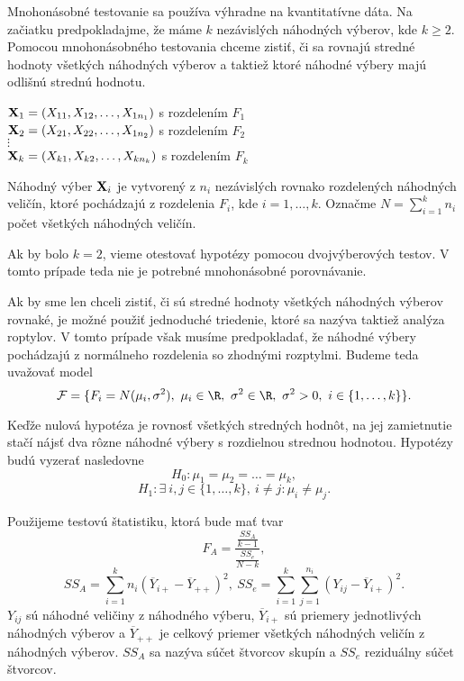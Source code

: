 Mnohonásobné testovanie sa používa výhradne na kvantitatívne dáta. 
Na začiatku predpokladajme, že máme $k$ nezávislých náhodných výberov, kde $k \geq 2$. 
Pomocou mnohonásobného testovania chceme zistiť, či sa rovnajú stredné hodnoty všetkých náhodných výberov 
a taktiež ktoré náhodné výbery majú odlišnú strednú hodnotu. 

\begin{center} 
$ {\bf X}_1 = (X_{11}, X_{12}, \dots, X_{1n_1}) $ s rozdelením $F_1$ \\
$ {\bf X}_2 = (X_{21}, X_{22}, \dots, X_{1n_2}) $ s rozdelením $F_2$ \\
$\vdots$ \\
$ {\bf X}_k = (X_{k1}, X_{k2}, \dots, X_{kn_k}) $ s rozdelením $F_k$ \\
\end{center}

Náhodný výber ${\bf X}_i$ je vytvorený z $n_i$ nezávislých rovnako rozdelených náhodných veličín, 
ktoré pochádzajú z rozdelenia $F_i$, kde $i=1, \dots, k$.
Označme $N = \sum_{i=1}^{k} n_i$ počet všetkých náhodných veličín. 

Ak by bolo $k=2$, vieme otestovať hypotézy pomocou dvojvýberových testov. 
V tomto prípade teda nie je potrebné mnohonásobné porovnávanie. 

Ak by sme len chceli zistiť, či sú stredné hodnoty všetkých náhodných výberov rovnaké, 
je možné použiť jednoduché triedenie, ktoré sa nazýva taktiež analýza roptylov. 
V tomto prípade však musíme predpokladať, že náhodné výbery pochádzajú z normálneho rozdelenia 
so zhodnými rozptylmi. 
Budeme teda uvažovať model
$$ \mathcal{F} = \{ F_i = N(\mu_i, \sigma^2),~\mu_i \in \R,~\sigma^2 \in \R,~\sigma^2>0,~i \in \{1, \dots, k\} \}. $$

Keďže nulová hypotéza je rovnosť všetkých stredných hodnôt, 
na jej zamietnutie stačí nájsť dva rôzne náhodné výbery s rozdielnou strednou hodnotou. 
Hypotézy budú vyzerať nasledovne
$$ H_0: \mu_1 = \mu_2 = \dots = \mu_k, $$
$$ H_1: \exists~i, j \in \{1, \dots, k\},~i \neq j : \mu_i \neq \mu_j. $$ 

Použijeme testovú štatistiku, ktorá bude mať tvar 
$$ F_A = \frac{\frac{SS_A}{k-1}}{\frac{SS_e}{N-k}}, $$
$$ SS_A = \sum_{i=1}^{k} n_i ( \overline{Y}_{i+} - \overline{Y}_{++} )^2,~
SS_e = \sum_{i=1}^{k} \sum_{j=1}^{n_i} ( Y_{ij} - \overline{Y}_{i+} )^2. $$
$Y_{ij}$ sú náhodné veličiny z náhodného výberu, 
$\overline{Y}_{i+}$ sú priemery jednotlivých náhodných výberov
a $\overline{Y}_{++}$ je celkový priemer všetkých náhodných veličín z náhodných výberov. 
$SS_A$ sa nazýva súčet štvorcov skupín a $SS_e$ reziduálny súčet štvorcov. 

